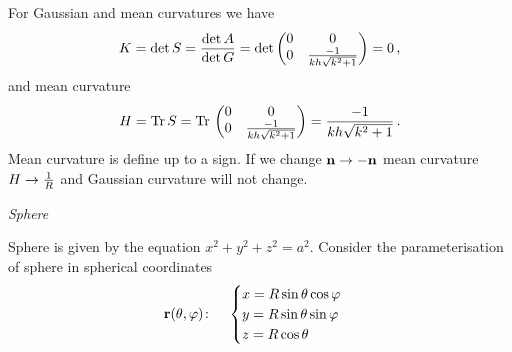 \documentclass[12pt]{article}
\theoremstyle{theorem}
\numberwithin{equation}{section}
\begin{document}
For Gaussian and mean curvatures we have
     \begin{equation}\label{Gaussianforcylinder}
        K=\det S={\det A\over \det G}=\det
                              \begin{pmatrix}0&0\cr
                                0&{-1\over kh\sqrt {k^2+1}}\cr
                                   \end{pmatrix}=0\,,
     \end{equation}
     and mean curvature
      \begin{equation}\label{meanianforcylinder}
        H={\rm Tr\,} S={\rm Tr\,}
                              \begin{pmatrix}0&0\cr
                                0&{-1\over kh\sqrt {k^2+1}}\cr
                                   \end{pmatrix}={-1\over kh\sqrt {k^2+1}}\,.
     \end{equation}
Mean curvature is define up to a sign. If we change ${\bf n}\to-{\bf n}$ mean curvature $H\to {1\over R}$ and Gaussian curvature
will not change.


\bigskip




{\it Sphere}


\medskip


  Sphere is given by the equation $x^2+y^2+z^2=a^2$. Consider the  parameterisation
 of sphere in spherical coordinates
\begin{equation}\label{surfacesphere11}
  {\bf r}(\theta,\varphi)\colon\quad
  \begin{cases}
  x=R\sin\theta\cos\varphi\\
  y=R\sin\theta\sin\varphi\\
  z=R\cos\theta\\
  \end{cases}
\end{equation}

\medskip
\end{document}
